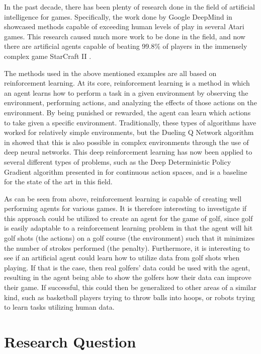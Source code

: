 \documentclass{kththesis}
\begin{document}
In the past decade, there has been plenty of research done in the field of artificial intelligence for games. Specifically, the work done by Google DeepMind in \textcite{mnih2015human} showcased methods capable of exceeding human levels of play in several Atari games. This research caused much more work to be done in the field, and now there are artificial agents capable of beating 99.8\% of players in the immensely complex game StarCraft II \parencite{vinyals2019grandmaster}. 

The methods used in the above mentioned examples are all based on reinforcement learning. At its core, reinforcement learning is a method in which an agent learns how to perform a task in a given environment by observing the environment, performing actions, and analyzing the effects of those actions on the environment. By being punished or rewarded, the agent can learn which actions to take given a specific environment. Traditionally, these types of algorithms have worked for relatively simple environments, but the Dueling Q Network algorithm in \textcite{mnih2015human} showed that this is also possible in complex environments through the use of deep neural networks. This deep reinforcement learning has now been applied to several different types of problems, such as the Deep Deterministic Policy Gradient algorithm presented in \textcite{lillicrap2015continuous} for continuous action spaces, and is a baseline for the state of the art in this field.

As can be seen from above, reinforcement learning is capable of creating well performing agents for various games. It is therefore interesting to investigate if this approach could be utilized to create an agent for the game of golf, since golf is easily adaptable to a reinforcement learning problem in that the agent will hit golf shots (the actions) on a golf course (the environment) such that it minimizes the number of strokes performed (the penalty). Furthermore, it is interesting to see if an artificial agent could learn how to utilize data from golf shots when playing. If that is the case, then real golfers' data could be used with the agent, resulting in the agent being able to show the golfers how their data can improve their game. If successful, this could then be generalized to other areas of a similar kind, such as basketball players trying to throw balls into hoops, or robots trying to learn tasks utilizing human data.

\section{Research Question}
\end{document}
